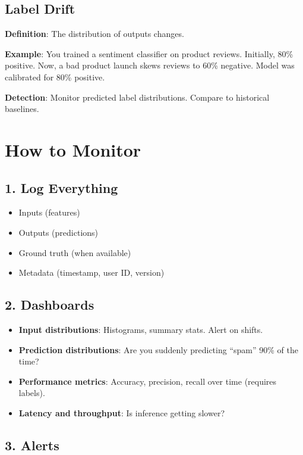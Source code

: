 \documentclass[11pt,oneside]{book}
\begin{document}
\subsection{Label Drift}

\textbf{Definition}: The distribution of outputs changes.

\textbf{Example}: You trained a sentiment classifier on product reviews. Initially, 80\% positive. Now, a bad product launch skews reviews to 60\% negative. Model was calibrated for 80\% positive.

\textbf{Detection}: Monitor predicted label distributions. Compare to historical baselines.

\section{How to Monitor}

\subsection{1. Log Everything}

\begin{itemize}
\item Inputs (features)
\item Outputs (predictions)
\item Ground truth (when available)
\item Metadata (timestamp, user ID, version)
\end{itemize}

\subsection{2. Dashboards}

\begin{itemize}
\item \textbf{Input distributions}: Histograms, summary stats. Alert on shifts.
\item \textbf{Prediction distributions}: Are you suddenly predicting ``spam'' 90\% of the time?
\item \textbf{Performance metrics}: Accuracy, precision, recall over time (requires labels).
\item \textbf{Latency and throughput}: Is inference getting slower?
\end{itemize}

\subsection{3. Alerts}
\end{document}

